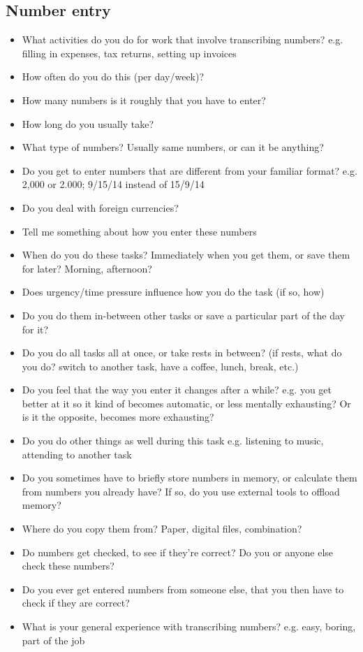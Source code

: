 \subsection{Number entry}
\begin{itemize}
\item  What activities do you do for work that involve transcribing numbers?
e.g. filling in expenses, tax returns, setting up invoices
\item How often do you do this (per day/week)?
\item How many numbers is it roughly that you have to enter?
\item How long do you usually take?
\item What type of numbers? Usually same numbers, or can it be anything?
\item Do you get to enter numbers that are different from your familiar format?
e.g. 2,000 or 2.000; 9/15/14 instead of 15/9/14
\item Do you deal with foreign currencies?
\item Tell me something about how you enter these numbers
\item When do you do these tasks? Immediately when you get them, or save them for later? Morning, afternoon?
\item Does urgency/time pressure influence how you do the task (if so, how)
\item Do you do them in-between other tasks or save a particular part of the day for it?
\item Do you do all tasks all at once, or take rests in between?
(if rests, what do you do? switch to another task, have a coffee, lunch, break, etc.)
\item Do you feel that the way you enter it changes after a while?
e.g. you get better at it so it kind of becomes automatic, or less mentally exhausting? Or is it the opposite, becomes more exhausting?
\item Do you do other things as well during this task
e.g. listening to music, attending to another task
\item Do you sometimes have to briefly store numbers in memory, or calculate them from numbers you already have?
If so, do you use external tools to offload memory?
\item Where do you copy them from? Paper, digital files, combination?
\item Do numbers get checked, to see if they're correct? Do you or anyone else check these numbers?
\item Do you ever get entered numbers from someone else, that you then have to check if they are correct?
\item What is your general experience with transcribing numbers?
e.g. easy, boring, part of the job
\end{itemize}
